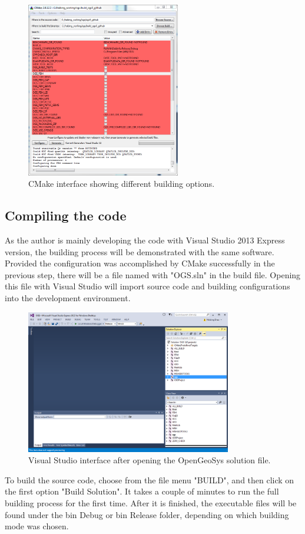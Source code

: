 \begin{figure}
\begin{center}
\includegraphics[width=0.6\textwidth]{fig/cmake_configured}
\end{center}
\caption{CMake interface showing different building options. }
\label{fig:cmake_configured}
\end{figure}
\subsection{Compiling the code}
As the author is mainly developing the code with Visual Studio 2013 Express version, the building process will be demonstrated with the same software. Provided the configuration was accomplished by CMake successfully in the previous step, there will be a file named with "OGS.sln" in the build file. Opening this file with Visual Studio will import source code and building configurations into the development environment. 
\begin{figure}
\begin{center}
\includegraphics[width=0.8\textwidth]{fig/vs2013exp_ogs}
\end{center}
\caption{Visual Studio interface after opening the OpenGeoSys solution file. }
\label{fig:vs2013exp_ogs}
\end{figure}
To build the source code, choose from the file menu "BUILD", and then click on the first option "Build Solution". It takes a couple of minutes to run the full building process for the first time. After it is finished, the executable files will be found under the bin Debug or bin Release folder, depending on which building mode was chosen. 

